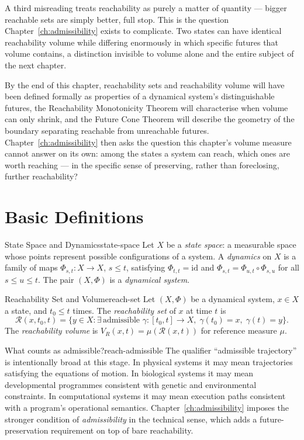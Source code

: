 \documentclass[12pt,twoside,openright]{book}
\newcommand{\reach}{\mathcal{R}}
\begin{document}
A third misreading treats reachability as purely a matter of
quantity --- bigger reachable sets are simply better, full
stop. This is the question Chapter~\ref{ch:admissibility}
exists to complicate. Two states can have identical
reachability volume while differing enormously in which
specific futures that volume contains, a distinction
invisible to volume alone and the entire subject of the next
chapter.

By the end of this chapter, reachability sets and reachability
volume will have been defined formally as properties of a
dynamical system's distinguishable futures, the Reachability
Monotonicity Theorem will characterise when volume can only
shrink, and the Future Cone Theorem will describe the
geometry of the boundary separating reachable from
unreachable futures. Chapter~\ref{ch:admissibility} then asks
the question this chapter's volume measure cannot answer on
its own: among the states a system can reach, which ones are
worth reaching --- in the specific sense of preserving, rather
than foreclosing, further reachability?

\section{Basic Definitions}
\label{sec:ch13-defs}

\begin{definition}{State Space and Dynamics}{state-space}
  Let $X$ be a \emph{state space}: a measurable space whose
  points represent possible configurations of a system. A
  \emph{dynamics} on $X$ is a family of maps
  $\Phi_{s,t} : X \to X$, $s \le t$, satisfying
  $\Phi_{t,t} = \mathrm{id}$ and
  $\Phi_{s,t} = \Phi_{u,t} \circ \Phi_{s,u}$ for all
  $s \le u \le t$. The pair $(X,\Phi)$ is a \emph{dynamical
  system}.
\end{definition}

\begin{definition}{Reachability Set and Volume}{reach-set}
  Let $(X,\Phi)$ be a dynamical system, $x\in X$ a state,
  and $t_0 \le t$ times. The \emph{reachability set} of $x$
  at time $t$ is
  \[
    \reach(x,t_0,t) = \{
      y\in X : \exists\, \text{admissible }
      \gamma:[t_0,t]\to X,\;
      \gamma(t_0)=x,\; \gamma(t)=y
    \}.
  \]
  The \emph{reachability volume} is
  $V_R(x,t) = \mu(\reach(x,t))$ for reference measure $\mu$.
\end{definition}

\begin{remark}{What counts as admissible?}{reach-admissible}
  The qualifier ``admissible trajectory'' is intentionally
  broad at this stage. In physical systems it may mean
  trajectories satisfying the equations of motion. In
  biological systems it may mean developmental programmes
  consistent with genetic and environmental constraints. In
  computational systems it may mean execution paths
  consistent with a program's operational semantics.
  Chapter~\ref{ch:admissibility} imposes the stronger
  condition of \emph{admissibility} in the technical sense,
  which adds a future-preservation requirement on top of
  bare reachability.
\end{remark}
\end{document}

